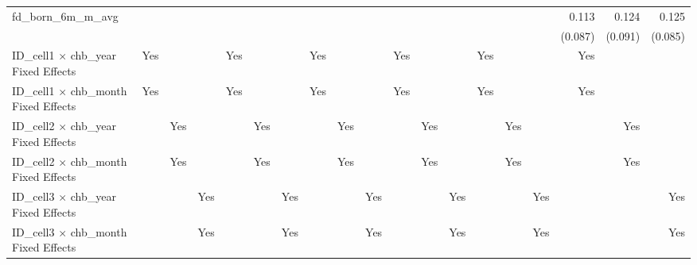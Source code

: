\begin{tabular}{lrrrrrrrrrrrrrrrrrr}
fd\_born\_6m\_m\_avg                        &             &             &             &             &             &             &             &             &             &             &             &             &             &             &             &       0.113 &       0.124 &       0.125 \\ 
                                            &             &             &             &             &             &             &             &             &             &             &             &             &             &             &             &     (0.087) &     (0.091) &     (0.085) \\ 
\midrule
ID\_cell1 $\times$ chb\_year Fixed Effects  &         Yes &             &             &         Yes &             &             &         Yes &             &             &         Yes &             &             &         Yes &             &             &         Yes &             &             \\ 
ID\_cell1 $\times$ chb\_month Fixed Effects &         Yes &             &             &         Yes &             &             &         Yes &             &             &         Yes &             &             &         Yes &             &             &         Yes &             &             \\ 
ID\_cell2 $\times$ chb\_year Fixed Effects  &             &         Yes &             &             &         Yes &             &             &         Yes &             &             &         Yes &             &             &         Yes &             &             &         Yes &             \\ 
ID\_cell2 $\times$ chb\_month Fixed Effects &             &         Yes &             &             &         Yes &             &             &         Yes &             &             &         Yes &             &             &         Yes &             &             &         Yes &             \\ 
ID\_cell3 $\times$ chb\_year Fixed Effects  &             &             &         Yes &             &             &         Yes &             &             &         Yes &             &             &         Yes &             &             &         Yes &             &             &         Yes \\ 
ID\_cell3 $\times$ chb\_month Fixed Effects &             &             &         Yes &             &             &         Yes &             &             &         Yes &             &             &         Yes &             &             &         Yes &             &             &         Yes \\ 

\end{tabular}
